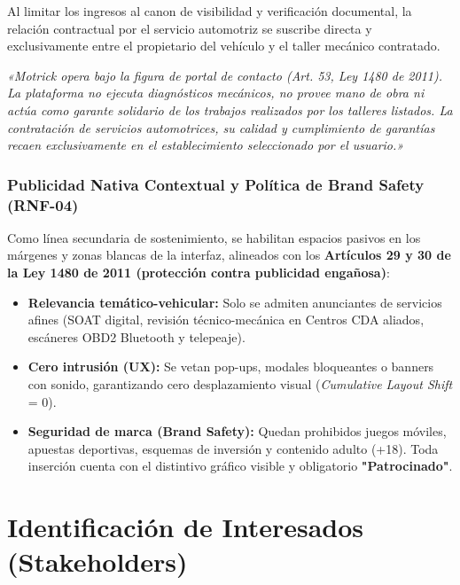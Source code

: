 \documentclass[11pt,letterpaper]{article}
\begin{document}
Al limitar los ingresos al canon de visibilidad y verificación documental, la relación contractual por el servicio automotriz se suscribe directa y exclusivamente entre el propietario del vehículo y el taller mecánico contratado.

\begin{legalcallout}
\textit{«Motrick opera bajo la figura de portal de contacto (Art. 53, Ley 1480 de 2011). La plataforma no ejecuta diagnósticos mecánicos, no provee mano de obra ni actúa como garante solidario de los trabajos realizados por los talleres listados. La contratación de servicios automotrices, su calidad y cumplimiento de garantías recaen exclusivamente en el establecimiento seleccionado por el usuario.»}
\end{legalcallout}

\subsubsection{Publicidad Nativa Contextual y Política de Brand Safety (RNF-04)}
Como línea secundaria de sostenimiento, se habilitan espacios pasivos en los márgenes y zonas blancas de la interfaz, alineados con los \textbf{Artículos 29 y 30 de la Ley 1480 de 2011 (protección contra publicidad engañosa)}:
\begin{itemize}
    \item \textbf{Relevancia temático-vehicular:} Solo se admiten anunciantes de servicios afines (SOAT digital, revisión técnico-mecánica en Centros CDA aliados, escáneres OBD2 Bluetooth y telepeaje).
    \item \textbf{Cero intrusión (UX):} Se vetan pop-ups, modales bloqueantes o banners con sonido, garantizando cero desplazamiento visual (\textit{Cumulative Layout Shift} = 0).
    \item \textbf{Seguridad de marca (Brand Safety):} Quedan prohibidos juegos móviles, apuestas deportivas, esquemas de inversión y contenido adulto (+18). Toda inserción cuenta con el distintivo gráfico visible y obligatorio \textbf{"Patrocinado"}.
\end{itemize}

\newpage

\section{Identificación de Interesados (Stakeholders)}
\end{document}
